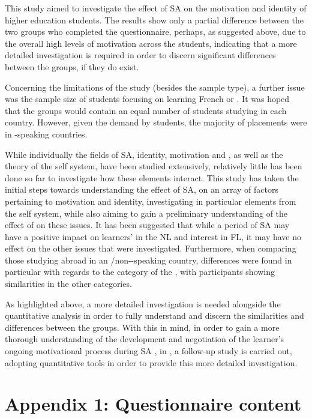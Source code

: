 \documentclass[output=paper]{langsci/langscibook}
\begin{document}
This study aimed to investigate the effect of SA on the motivation and identity of higher education students. The results show only a partial difference between the two groups who completed the questionnaire, perhaps, as suggested above, due to the overall high levels of motivation across the students, indicating that a more detailed investigation is required in order to discern significant differences between the groups, if they do exist.

Concerning the limitations of the study (besides the sample type), a further issue was the sample size of students focusing on learning French or . It was hoped that the groups would contain an equal number of students studying in each country. However, given the demand by students, the majority of placements were in -speaking countries.

While individually the fields of SA, identity, motivation and , as well as the theory of the   self system, have been studied extensively, relatively little has been done so far to investigate how these elements interact. This study has taken the initial steps towards understanding the effect of SA, on an array of factors pertaining to motivation and identity, investigating in particular elements from the   self system, while also aiming to gain a preliminary understanding of the effect of  on these issues. It has been suggested that while a period of SA may have a positive impact on learners'  in the NL and interest in FL, it may have no effect on the other issues that were investigated. Furthermore, when comparing those studying abroad in an /non--speaking country, differences were found in particular with regards to the category of the , with participants showing similarities in the other categories.

\newpage 
As highlighted above, a more detailed investigation is needed alongside the quantitative analysis in order to fully understand and discern the similarities and differences between the groups. With this in mind, in order to gain a more thorough understanding of the development and negotiation of the learner’s ongoing motivational process during SA \citep{Kim2009}, in \citet{GeogheganPerezVidalForthcoming}, a follow-up study is carried out, adopting quantitative tools in order to provide this more detailed investigation. 
 
\section*{Appendix 1: Questionnaire content}
\sloppy 
\end{document}
